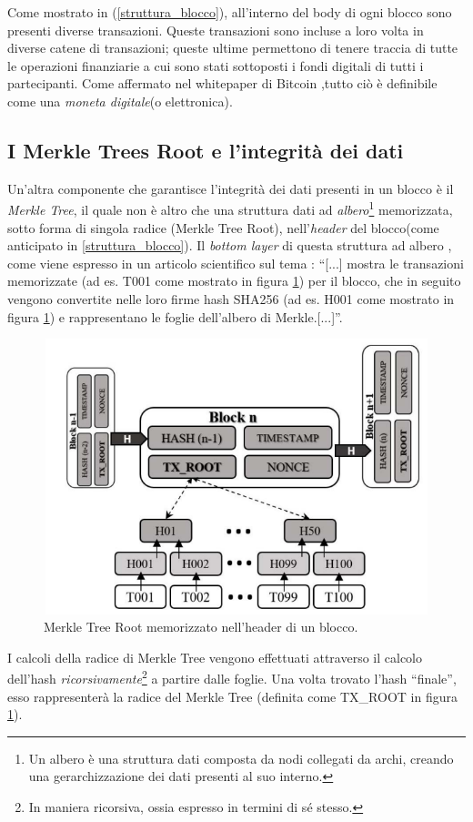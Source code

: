 Come mostrato in (\ref{struttura_blocco}), all'interno del body di ogni blocco sono presenti diverse transazioni. Queste transazioni sono incluse a loro volta in diverse catene di transazioni; queste ultime permettono di tenere traccia di tutte
le operazioni finanziarie a cui sono stati sottoposti i fondi digitali di tutti i partecipanti. Come affermato nel whitepaper di Bitcoin \cite{bitcoin} ,tutto ciò è definibile come una \textit{moneta digitale}(o elettronica).

\subsection{I Merkle Trees Root e l'integrità dei dati}\label{Merkle_Tree}
Un'altra componente che garantisce l'integrità dei dati presenti in un blocco è il \textit{Merkle Tree}, il quale non è altro che una struttura dati ad \textit{albero}\footnote{Un albero è una struttura dati composta da nodi collegati da archi, creando una gerarchizzazione dei dati presenti al  suo interno.} memorizzata, sotto forma di singola radice (Merkle Tree Root), nell'\textit{header} del blocco(come anticipato in \ref{struttura_blocco}).
Il \textit{bottom layer} di questa struttura ad albero , come viene espresso in un articolo scientifico sul tema \cite{merkle_tree}: “[...] mostra le transazioni memorizzate (ad es. T001 come mostrato in figura \ref{merkle_root_img}) per il blocco, che in seguito vengono convertite nelle loro firme hash SHA256 (ad es. H001 come mostrato in figura \ref{merkle_root_img}) e rappresentano le foglie dell'albero di Merkle.[...]”.

\begin{figure}[h]
    \centering
    \includegraphics[width=12cm,height=8cm]{Immagini/Merkle_Tree.png}
    \caption[Merkle Tree Root]{Merkle Tree Root memorizzato nell'header di un blocco.}
    \label{merkle_root_img}
\end{figure}
I calcoli della radice di Merkle Tree vengono effettuati attraverso il calcolo dell'hash \textit{ricorsivamente}\footnote{In maniera ricorsiva, ossia espresso in termini di sé stesso.} a partire dalle foglie. Una volta trovato l'hash “finale”, esso rappresenterà la radice del Merkle Tree (definita come TX\_ROOT in figura \ref{merkle_root_img}).

